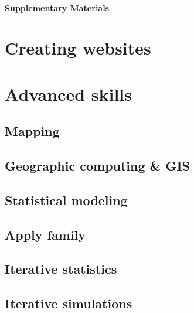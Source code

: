 \documentclass[
]{book}
\begin{document}
\hypertarget{supplementary-materials}{%
\subsection{Supplementary Materials}\label{supplementary-materials}}

\hypertarget{part-creating-websites}{%
\part{Creating websites}\label{part-creating-websites}}

\hypertarget{part-advanced-skills}{%
\part{Advanced skills}\label{part-advanced-skills}}

\hypertarget{mapping}{%
\chapter{Mapping}\label{mapping}}

\hypertarget{geographic-computing-gis}{%
\chapter{Geographic computing \& GIS}\label{geographic-computing-gis}}

\hypertarget{statistical-modeling}{%
\chapter{Statistical modeling}\label{statistical-modeling}}

\hypertarget{apply-family}{%
\chapter{Apply family}\label{apply-family}}

\hypertarget{iterative-statistics}{%
\chapter{Iterative statistics}\label{iterative-statistics}}

\hypertarget{iterative-simulations}{%
\chapter{Iterative simulations}\label{iterative-simulations}}
\end{document}
